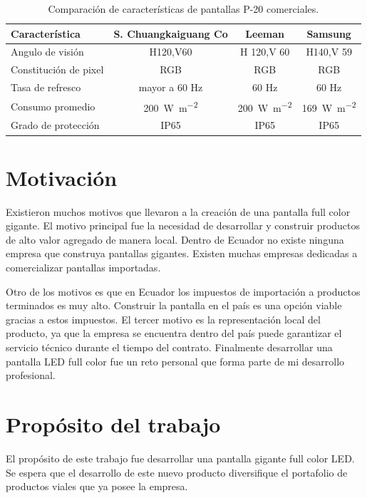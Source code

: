 \begin{table}[h]
\centering
\caption[Comparación entre pantallas P-20]{Comparación de características de pantallas P-20 comerciales.}
\begin{tabular}{l c c c}
\toprule
\textbf{Característica} & \textbf{S. Chuangkaiguang Co \citep{TABLAREF1}} & \textbf{Leeman \citep{TABLAREF2}} & \textbf{Samsung \citep{TABLAREF3}} \\
\midrule 

Angulo de visión        & H120,V60 & H 120,V 60 & H140,V 59 \\
Constitución de pixel   & RGB & RGB & RGB \\
Tasa de refresco        & mayor a 60 Hz & 60 Hz & 60 Hz \\
Consumo promedio        & \SI{200}{\watt\per\meter\squared} & \SI{200}{\watt\per\meter\squared} & \SI{169}{\watt\per\meter\squared} \\
Grado de protección     & IP65 & IP65 & IP65 \\

\bottomrule
\hline
\end{tabular}
\label{tab:comercial}
\end{table}





\section{Motivación}
Existieron muchos motivos que llevaron a la creación de una pantalla full color gigante. El motivo principal fue la necesidad de desarrollar y construir productos de alto valor agregado de manera local. Dentro de Ecuador no existe ninguna empresa que construya pantallas gigantes. Existen muchas empresas dedicadas a comercializar pantallas importadas. 

Otro de los motivos es que en Ecuador los impuestos de importación a productos terminados es muy alto. Construir la pantalla en el país es una opción viable gracias a estos impuestos. El tercer motivo es la representación local del producto, ya que la empresa se encuentra dentro del país puede garantizar el servicio técnico durante el tiempo del contrato. Finalmente desarrollar una pantalla LED full color fue un reto personal que forma parte de mi desarrollo profesional. 



\section{Propósito del trabajo}
El propósito de este trabajo fue desarrollar una pantalla gigante full color LED. Se espera que el desarrollo de este nuevo producto diversifique el portafolio de productos viales que ya posee la empresa.
